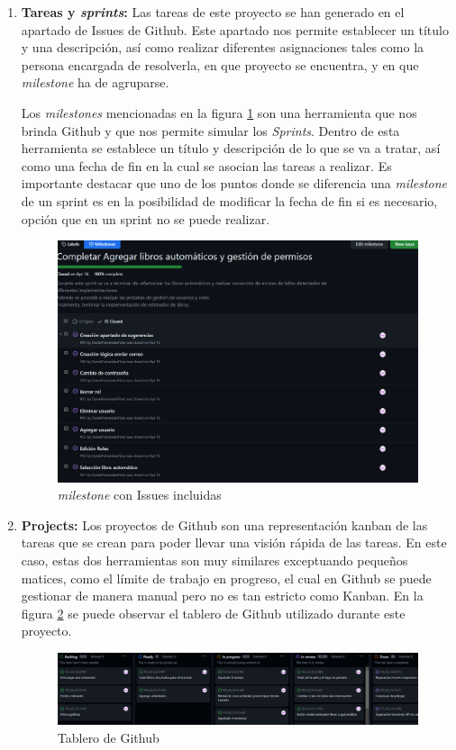 \begin{enumerate}
    \item \textbf{Tareas y \textit{sprints}:}
    Las tareas de este proyecto se han generado en el apartado de Issues de Github. Este apartado nos permite establecer un título y una descripción, así como realizar diferentes asignaciones tales como la persona encargada de resolverla, en que proyecto se encuentra, y en que \textit{milestone} ha de agruparse.

    Los \textit{milestones} mencionadas en la figura \ref{Milestones con Issues incluidas} son una herramienta que nos brinda Github y que nos permite simular los \textit{Sprints}. Dentro de esta herramienta se establece un título y descripción de lo que se va a tratar, así como una fecha de fin en la cual se asocian las tareas a realizar. Es importante destacar que uno de los puntos donde se diferencia una \textit{milestone} de un sprint es en la posibilidad de modificar la fecha de fin si es necesario, opción que en un sprint no se puede realizar.
    \begin{figure}[htbp]
        \centering
        \includegraphics[width=0.8\linewidth]{Imagenes/milestone.png}
        \caption{\textit{milestone} con Issues incluidas}
        \label{Milestones con Issues incluidas}
    \end{figure}
    \FloatBarrier

    \item \textbf{Projects:}
    Los proyectos de Github son una representación kanban de las tareas que se crean para poder llevar una visión rápida de las tareas. En este caso, estas dos herramientas son muy similares exceptuando pequeños matices, como el límite de trabajo en progreso, el cual en Github se puede gestionar de manera manual pero no es tan estricto como Kanban. En la figura \ref{Tablero de Github} se puede observar el tablero de Github utilizado durante este proyecto.
    \begin{figure}[htbp]
        \centering
        \includegraphics[width=0.8\linewidth]{Imagenes/TableroGithub.png}
        \caption{Tablero de Github}
        \label{Tablero de Github}
    \end{figure}
    \FloatBarrier
\end{enumerate}

